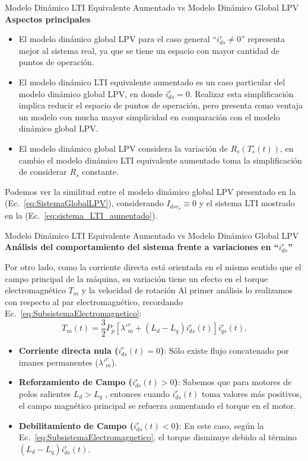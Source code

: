 \documentclass[12pt]{beamer}
\begin{document}
\begin{frame}{Modelo Dinámico LTI Equivalente Aumentado vs Modelo Dinámico Global LPV}\footnotesize
    \textbf{Aspectos principales}
    \begin{itemize}
        \item El modelo dinámico global LPV para el caso general ``\(i^r_{ds} \neq 0\)'' representa mejor al sistema real, ya que se tiene un espacio con mayor cantidad de puntos de operación.
        \item El modelo dinámico LTI equivalente aumentado es un caso particular del modelo dinámico global LPV, en donde \(i^r_{ds} = 0\). Realizar esta simplificación implica reducir el espacio de puntos de operación, pero presenta como ventaja un modelo con mucha mayor simplicidad en comparación con el modelo dinámico global LPV.
        \item El modelo dinámico global LPV considera la variación de \(R_{s}(T^\circ_{s}(t))\), en cambio el modelo dinámico LTI equivalente aumentado toma la simplificación de considerar \(R_{s}\) constante.
    \end{itemize}
    Podemos ver la similitud entre el modelo dinámico global LPV presentado en la (Ec.~\ref{eq:SistemaGlobalLPV}), considerando \(I_{dsr_o} \equiv 0\) y el sistema LTI mostrado en la (Ec.~\ref{eq:sistema_LTI_aumentado}).
\end{frame}

\begin{frame}{Modelo Dinámico LTI Equivalente Aumentado vs Modelo Dinámico Global LPV}\footnotesize
\textbf{Análisis del comportamiento del sistema frente a variaciones en ``\(i^r_{ds}\)''}

Por otro lado, como la corriente directa está orientada en el mismo sentido que el campo
principal de la máquina, su variación tiene un efecto en el torque electromagnético $T_{m}$ y la velocidad de rotación
Al primer análisis lo realizamos con respecto al par electromagnético, recordando Ec.~\ref{eq:SubsistemaElectromagnetico}:
 \begin{equation*}
     T_m(t) = \frac{3}{2} P_p [\lambda'^r_m + (L_d - L_q) i_{ds}^r(t)] i_{qs}^r(t).
 \end{equation*}

\begin{itemize}
    \item \textbf{Corriente directa nula (\(i^r_{ds}(t) = 0\))}: Sólo existe flujo concatenado por imanes permanentes (\(\lambda'^r_m\)).
    
    \item \textbf{Reforzamiento de Campo (\(i^r_{ds}(t) > 0\))}: Sabemos que para motores de polos salientes \(L_d > L_q\) , entonces cuando \(i^r_{ds}(t)\) toma valores más positivos, el campo
    magnético principal se refuerza aumentando el torque en el motor. 
    
    \item \textbf{Debilitamiento de Campo (\(i^r_{ds}(t) < 0\))}: En este caso, según la Ec.~\ref{eq:SubsistemaElectromagnetico}, el torque disminuye debido al término \((L_d - L_q)i^r_{ds}(t)\).
\end{itemize}
\end{frame}
\end{document}
